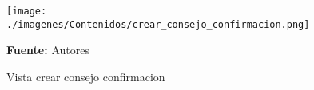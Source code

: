 \begin{figure}[!htb]
  \begin{center}
\texttt{[image: ./imagenes/Contenidos/crear\_consejo\_confirmacion.png]}
    \caption{Vista crear consejo confirmacion}
    \label{fig:Vista_crear_consejo_confirmacion}
    \textbf{Fuente:}  Autores
  \end{center}
\end{figure}
